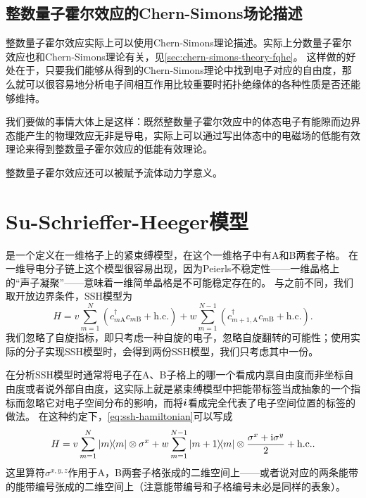 \subsection{整数量子霍尔效应的Chern-Simons场论描述}

整数量子霍尔效应实际上可以使用Chern-Simons理论描述\cite{topological_insulator_concepts}。实际上分数量子霍尔效应也和Chern-Simons理论有关，见\autoref{sec:chern-simons-theory-fqhe}。
这样做的好处在于，只要我们能够从得到的Chern-Simons理论中找到电子对应的自由度，那么就可以很容易地分析电子间相互作用比较重要时拓扑绝缘体的各种性质是否还能够维持。

我们要做的事情大体上是这样：既然整数量子霍尔效应中的体态电子有能隙而边界态能产生的物理效应无非是导电，实际上可以通过写出体态中的电磁场的低能有效理论来得到整数量子霍尔效应的低能有效理论。

整数量子霍尔效应还可以被赋予流体动力学意义\cite{Chan_2016}。

\section{Su-Schrieffer-Heeger模型}\label{sec:ssh}

是一个定义在一维格子上的紧束缚模型，在这个一维格子中有A和B两套子格\cite{Asb_th_2016}。
在一维导电分子链上这个模型很容易出现，因为Peierls不稳定性——一维晶格上的“声子凝聚”——意味着一维简单晶格是不可能稳定存在的。
与之前不同，我们取开放边界条件，SSH模型为
\begin{equation}
    H = v \sum_{m=1}^N (c^\dagger_{m \text{A}} c_{m \text{B}} + \text{h.c.}) + w \sum_{m=1}^{N-1} (c^\dagger_{m+1, \text{A}} c_{m \text{B}} +  \text{h.c.}).
    \label{eq:ssh-hamiltonian}
\end{equation}
我们忽略了自旋指标，即只考虑一种自旋的电子，忽略自旋翻转的可能性；使用实际的分子实现SSH模型时，会得到两份SSH模型，我们只考虑其中一份。

在分析SSH模型时通常将电子在A、B子格上的哪一个看成内禀自由度而非坐标自由度或者说外部自由度，这实际上就是紧束缚模型中把能带标签当成抽象的一个指标而忽略它对电子空间分布的影响，而将$\vb*{i}$看成完全代表了电子空间位置的标签的做法。
在这种约定下，\eqref{eq:ssh-hamiltonian}可以写成
\begin{equation}
    H = v \sum_{m=1}^N \dyad{m} \otimes \sigma^x + w \sum_{m=1}^{N-1} \dyad{m+1}{m} \otimes \frac{\sigma^x + \ii \sigma^y}{2} + \text{h.c.}. 
    \label{eq:ssh-pseudospin-hamiltonian}
\end{equation}
这里算符$\sigma^{x, y, z}$作用于A，B两套子格张成的二维空间上——或者说对应的两条能带的能带编号张成的二维空间上（注意能带编号和子格编号未必是同样的表象）。

